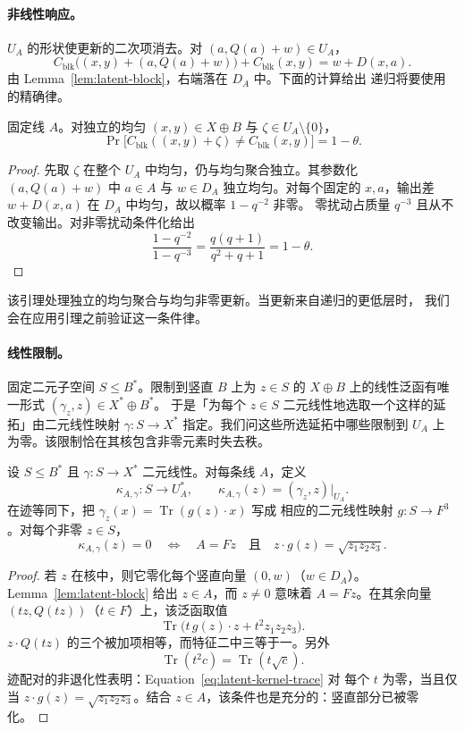 \paragraph{非线性响应。}
$U_A$ 的形状使更新的二次项消去。对 $(a,Q(a)+w)\in U_A$，
\[
 C_{\mathrm{blk}}\bigl((x,y)+(a,Q(a)+w)\bigr)
       +C_{\mathrm{blk}}(x,y)
 =w+D(x,a).
\]
由 Lemma~\ref{lem:latent-block}，右端落在 $D_A$ 中。下面的计算给出
递归将要使用的精确律。

\begin{lemma}[对一次块更新的响应]\label{lem:latent-block-noise}
固定线 $A$。对独立的均匀 $(x,y)\in X\oplus B$ 与
$\zeta\in U_A\setminus\{0\}$，
\[
 \Pr\bigl[C_{\mathrm{blk}}((x,y)+\zeta)
             \ne C_{\mathrm{blk}}(x,y)\bigr]=1-\theta.
\]
\end{lemma}

\begin{proof}
先取 $\zeta$ 在整个 $U_A$ 中均匀，仍与均匀聚合独立。其参数化
$(a,Q(a)+w)$ 中 $a\in A$ 与 $w\in D_A$ 独立均匀。对每个固定的
$x,a$，输出差 $w+D(x,a)$ 在 $D_A$ 中均匀，故以概率 $1-q^{-2}$ 非零。
零扰动占质量 $q^{-3}$ 且从不改变输出。对非零扰动条件化给出
\[
 \frac{1-q^{-2}}{1-q^{-3}}
 =\frac{q(q+1)}{q^2+q+1}=1-\theta.
\]
\end{proof}

该引理处理独立的均匀聚合与均匀非零更新。当更新来自递归的更低层时，
我们会在应用引理之前验证这一条件律。

\paragraph{线性限制。}
固定二元子空间 $S\le B^*$。限制到竖直 $B$ 上为 $z\in S$ 的
$X\oplus B$ 上的线性泛函有唯一形式 $(\gamma_z,z)\in X^*\oplus B^*$。
于是「为每个 $z\in S$ 二元线性地选取一个这样的延拓」由二元线性映射
$\gamma:S\to X^*$ 指定。我们问这些所选延拓中哪些限制到 $U_A$ 上
为零。该限制恰在其核包含非零元素时失去秩。

\begin{lemma}[块限制的核]\label{lem:latent-block-kernel}
设 $S\le B^*$ 且 $\gamma:S\to X^*$ 二元线性。对每条线 $A$，定义
\[
 \kappa_{A,\gamma}:S\longrightarrow U_A^*,
 \qquad \kappa_{A,\gamma}(z)=(\gamma_z,z)|_{U_A}.
\]
在迹等同下，把 $\gamma_z(x)=\operatorname{Tr}(g(z)\cdot x)$ 写成
相应的二元线性映射 $g:S\to F^3$。对每个非零 $z\in S$，
\[
 \kappa_{A,\gamma}(z)=0
 \quad\Longleftrightarrow\quad
 A=Fz
 \quad\text{且}\quad
 z\cdot g(z)=\sqrt{z_1z_2z_3}.
\]
\end{lemma}

\begin{proof}
若 $z$ 在核中，则它零化每个竖直向量 $(0,w)$（$w\in D_A$）。
Lemma~\ref{lem:latent-block} 给出 $z\in A$，而 $z\ne0$ 意味着
$A=Fz$。在其余向量 $(tz,Q(tz))$（$t\in F$）上，该泛函取值
\begin{equation}\label{eq:latent-kernel-trace}
 \operatorname{Tr}\bigl(t\,g(z)\cdot z+t^2z_1z_2z_3\bigr).
\end{equation}
$z\cdot Q(tz)$ 的三个被加项相等，而特征二中三等于一。另外
\[
 \operatorname{Tr}(t^2c)=\operatorname{Tr}(t\sqrt c).
\]
迹配对的非退化性表明：Equation~\eqref{eq:latent-kernel-trace} 对
每个 $t$ 为零，当且仅当 $z\cdot g(z)=\sqrt{z_1z_2z_3}$。结合
$z\in A$，该条件也是充分的：竖直部分已被零化。
\end{proof}


